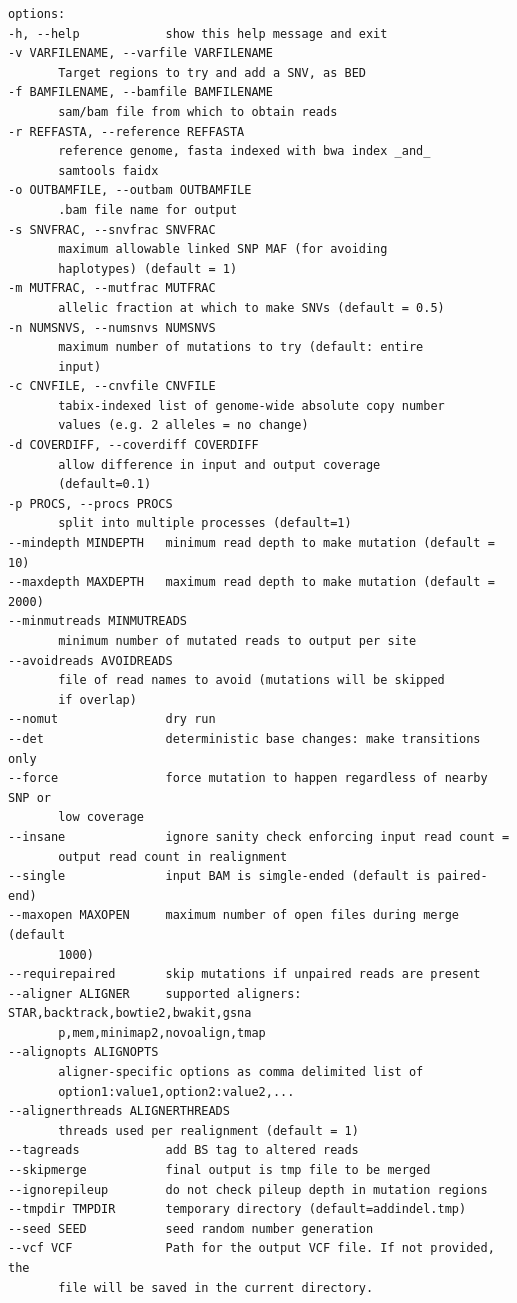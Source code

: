 \documentclass[letterpaper,11pt]{article}
\begin{document}
\begin{verbatim}
options:
-h, --help            show this help message and exit
-v VARFILENAME, --varfile VARFILENAME
       Target regions to try and add a SNV, as BED
-f BAMFILENAME, --bamfile BAMFILENAME
       sam/bam file from which to obtain reads
-r REFFASTA, --reference REFFASTA
       reference genome, fasta indexed with bwa index _and_
       samtools faidx
-o OUTBAMFILE, --outbam OUTBAMFILE
       .bam file name for output
-s SNVFRAC, --snvfrac SNVFRAC
       maximum allowable linked SNP MAF (for avoiding
       haplotypes) (default = 1)
-m MUTFRAC, --mutfrac MUTFRAC
       allelic fraction at which to make SNVs (default = 0.5)
-n NUMSNVS, --numsnvs NUMSNVS
       maximum number of mutations to try (default: entire
       input)
-c CNVFILE, --cnvfile CNVFILE
       tabix-indexed list of genome-wide absolute copy number
       values (e.g. 2 alleles = no change)
-d COVERDIFF, --coverdiff COVERDIFF
       allow difference in input and output coverage
       (default=0.1)
-p PROCS, --procs PROCS
       split into multiple processes (default=1)
--mindepth MINDEPTH   minimum read depth to make mutation (default = 10)
--maxdepth MAXDEPTH   maximum read depth to make mutation (default = 2000)
--minmutreads MINMUTREADS
       minimum number of mutated reads to output per site
--avoidreads AVOIDREADS
       file of read names to avoid (mutations will be skipped
       if overlap)
--nomut               dry run
--det                 deterministic base changes: make transitions only
--force               force mutation to happen regardless of nearby SNP or
       low coverage
--insane              ignore sanity check enforcing input read count =
       output read count in realignment
--single              input BAM is simgle-ended (default is paired-end)
--maxopen MAXOPEN     maximum number of open files during merge (default
       1000)
--requirepaired       skip mutations if unpaired reads are present
--aligner ALIGNER     supported aligners: STAR,backtrack,bowtie2,bwakit,gsna
       p,mem,minimap2,novoalign,tmap
--alignopts ALIGNOPTS
       aligner-specific options as comma delimited list of
       option1:value1,option2:value2,...
--alignerthreads ALIGNERTHREADS
       threads used per realignment (default = 1)
--tagreads            add BS tag to altered reads
--skipmerge           final output is tmp file to be merged
--ignorepileup        do not check pileup depth in mutation regions
--tmpdir TMPDIR       temporary directory (default=addindel.tmp)
--seed SEED           seed random number generation
--vcf VCF             Path for the output VCF file. If not provided, the
       file will be saved in the current directory.

\end{verbatim}
\end{document}
